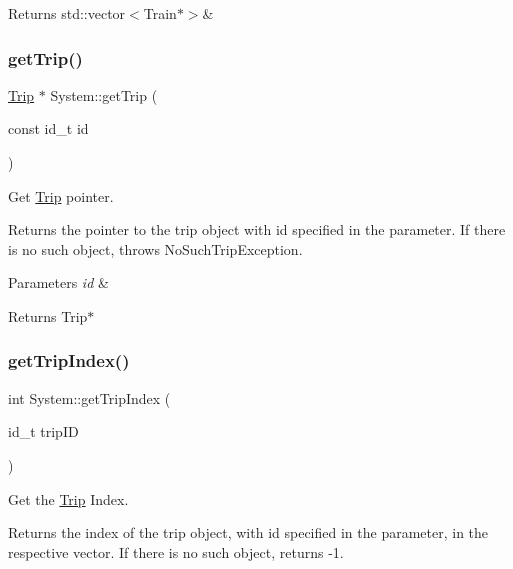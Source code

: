 \begin{DoxyReturn}{Returns}
std\+::vector$<$\+Train$\ast$$>$\& 
\end{DoxyReturn}
\mbox{\label{classSystem_a518ff04299c8b37d3cbec814ac0b7ec6}} 
\subsubsection{\texorpdfstring{get\+Trip()}{getTrip()}}
{\footnotesize\ttfamily \mbox{\hyperlink{classTrip}{Trip}} $\ast$ System\+::get\+Trip (\begin{DoxyParamCaption}\item[{const id\+\_\+t}]{id }\end{DoxyParamCaption})}



Get \mbox{\hyperlink{classTrip}{Trip}} pointer. 

Returns the pointer to the trip object with id specified in the parameter. If there is no such object, throws No\+Such\+Trip\+Exception.


\begin{DoxyParams}{Parameters}
{\em id} & \\
\hline
\end{DoxyParams}
\begin{DoxyReturn}{Returns}
Trip$\ast$ 
\end{DoxyReturn}
\mbox{\label{classSystem_aa431fdc152458fc39efb9a60e9f62f01}} 
\subsubsection{\texorpdfstring{get\+Trip\+Index()}{getTripIndex()}}
{\footnotesize\ttfamily int System\+::get\+Trip\+Index (\begin{DoxyParamCaption}\item[{id\+\_\+t}]{trip\+ID }\end{DoxyParamCaption})}



Get the \mbox{\hyperlink{classTrip}{Trip}} Index. 

Returns the index of the trip object, with id specified in the parameter, in the respective vector. If there is no such object, returns -\/1.


